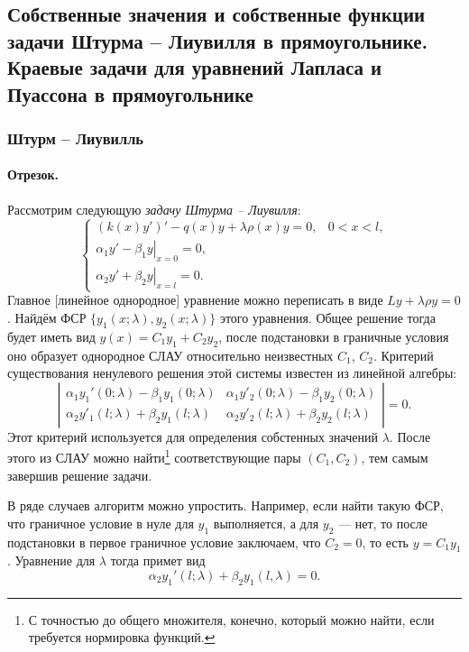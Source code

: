 \subsection{Собственные значения и собственные функции задачи Штурма -- Лиувилля
в прямоугольнике. Краевые задачи для уравнений Лапласа и Пуассона в
прямоугольнике}
\subsubsection{Штурм -- Лиувилль}
\label{sec:S-L}
\paragraph{Отрезок.} Рассмотрим следующую \emph{задачу Штурма -- Лиувилля}: 
\[
  \begin{cases}
    \left( k(x) y' \right)' - q(x)y + \lambda\rho(x) y =0, &
    0<x<l,\\
    \left.\alpha_1 y' - \beta_1 y \right|_{x=0} = 0,\\
      \left. \alpha_2 y'+ \beta_2 y \right|_{x=l} = 0.
  \end{cases}
\]
Главное [линейное однородное] уравнение можно переписать в виде $ Ly +\lambda\rho y = 0 $.
Найдём ФСР $ \{y_1(x; \lambda), y_2(x; \lambda)\} $ этого уравнения. Общее
решение тогда будет иметь вид $ y(x) = C_1y_1 + C_2y_2 $, после подстановки в
граничные условия оно образует однородное СЛАУ относительно неизвестных $ C_1 $, $ C_2 $.
Критерий существования ненулевого решения этой системы известен из линейной
алгебры: 
\[
  \left| \begin{matrix}
    \alpha_1y_1'(0;\lambda) - \beta_1y_1(0; \lambda) & \alpha_1y'_2(0;\lambda) -
    \beta_1y_2(0;\lambda) \\
    \alpha_2y'_1(l; \lambda) + \beta_2y_1(l;\lambda) & \alpha_2y'_2(l;\lambda) +
    \beta_2y_2(l;\lambda)
  \end{matrix} \right| = 0.
\]
Этот критерий используется для определения собстенных значений $ \lambda $.
После этого из СЛАУ можно найти\footnote{С точностью до общего множителя, конечно,
который можно найти, если требуется нормировка функций.} соответствующие пары $ (C_1, C_2) $, тем самым
завершив решение задачи.

В ряде случаев алгоритм можно упростить. Например, если найти такую ФСР, что
граничное условие в нуле для $ y_1 $ выполняется, а для $ y_2 $ --- нет, то
после подстановки в первое граничное условие заключаем, что $ C_2 = 0 $, то есть
$ y = C_1y_1 $. Уравнение для $ \lambda $ тогда примет вид  
\[
    \alpha_2 y_1'(l; \lambda) + \beta_2 y_1(l,\lambda) = 0.
\]

